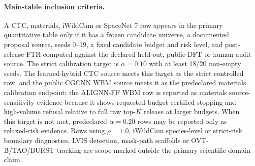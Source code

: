 \documentclass[11pt]{article}
\begin{document}
\paragraph{Main-table inclusion criteria.}
A CTC, materials, iWildCam or SpaceNet 7 row appears in the primary quantitative table only if it has a frozen candidate universe, a documented proposal source, seeds 0--19, a fixed candidate budget and risk level, and post-release FTR computed against the declared held-out, public-DFT or human-audit source.
The strict calibration target is \(\alpha=0.10\) with at least 18/20 non-empty seeds.
The learned-hybrid CTC source meets this target as the strict controlled row, and the public CGCNN WBM source meets it as the predeclared materials calibration endpoint; the ALIGNN-FF WBM row is reported as materials source-sensitivity evidence because it shows requested-budget certified stopping and high-volume refusal relative to full raw top-\(K\) release at larger budgets.
When this target is not met, predeclared \(\alpha=0.20\) rows may be reported only as relaxed-risk evidence.
Rows using \(\rho=1.0\), iWildCam species-level or strict-risk boundary diagnostics, LVIS detection, mask-path scaffolds or OVT-B/TAO/BURST tracking are scope-marked outside the primary scientific-domain claim.
\end{document}
